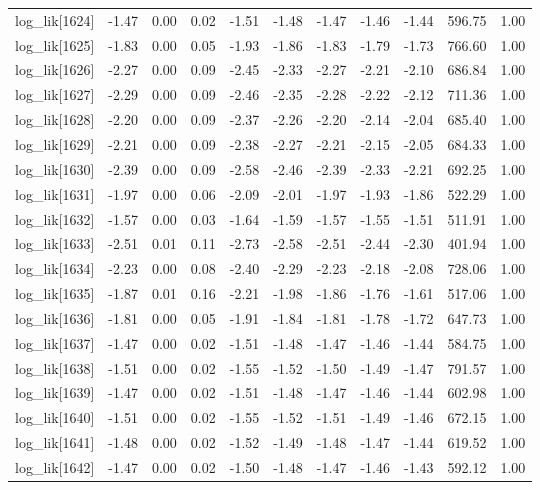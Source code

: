 \begin{table}[ht]
\begin{tabular}{rrrrrrrrrrr}
  log\_lik[1624] & -1.47 & 0.00 & 0.02 & -1.51 & -1.48 & -1.47 & -1.46 & -1.44 & 596.75 & 1.00 \\ 
  log\_lik[1625] & -1.83 & 0.00 & 0.05 & -1.93 & -1.86 & -1.83 & -1.79 & -1.73 & 766.60 & 1.00 \\ 
  log\_lik[1626] & -2.27 & 0.00 & 0.09 & -2.45 & -2.33 & -2.27 & -2.21 & -2.10 & 686.84 & 1.00 \\ 
  log\_lik[1627] & -2.29 & 0.00 & 0.09 & -2.46 & -2.35 & -2.28 & -2.22 & -2.12 & 711.36 & 1.00 \\ 
  log\_lik[1628] & -2.20 & 0.00 & 0.09 & -2.37 & -2.26 & -2.20 & -2.14 & -2.04 & 685.40 & 1.00 \\ 
  log\_lik[1629] & -2.21 & 0.00 & 0.09 & -2.38 & -2.27 & -2.21 & -2.15 & -2.05 & 684.33 & 1.00 \\ 
  log\_lik[1630] & -2.39 & 0.00 & 0.09 & -2.58 & -2.46 & -2.39 & -2.33 & -2.21 & 692.25 & 1.00 \\ 
  log\_lik[1631] & -1.97 & 0.00 & 0.06 & -2.09 & -2.01 & -1.97 & -1.93 & -1.86 & 522.29 & 1.00 \\ 
  log\_lik[1632] & -1.57 & 0.00 & 0.03 & -1.64 & -1.59 & -1.57 & -1.55 & -1.51 & 511.91 & 1.00 \\ 
  log\_lik[1633] & -2.51 & 0.01 & 0.11 & -2.73 & -2.58 & -2.51 & -2.44 & -2.30 & 401.94 & 1.00 \\ 
  log\_lik[1634] & -2.23 & 0.00 & 0.08 & -2.40 & -2.29 & -2.23 & -2.18 & -2.08 & 728.06 & 1.00 \\ 
  log\_lik[1635] & -1.87 & 0.01 & 0.16 & -2.21 & -1.98 & -1.86 & -1.76 & -1.61 & 517.06 & 1.00 \\ 
  log\_lik[1636] & -1.81 & 0.00 & 0.05 & -1.91 & -1.84 & -1.81 & -1.78 & -1.72 & 647.73 & 1.00 \\ 
  log\_lik[1637] & -1.47 & 0.00 & 0.02 & -1.51 & -1.48 & -1.47 & -1.46 & -1.44 & 584.75 & 1.00 \\ 
  log\_lik[1638] & -1.51 & 0.00 & 0.02 & -1.55 & -1.52 & -1.50 & -1.49 & -1.47 & 791.57 & 1.00 \\ 
  log\_lik[1639] & -1.47 & 0.00 & 0.02 & -1.51 & -1.48 & -1.47 & -1.46 & -1.44 & 602.98 & 1.00 \\ 
  log\_lik[1640] & -1.51 & 0.00 & 0.02 & -1.55 & -1.52 & -1.51 & -1.49 & -1.46 & 672.15 & 1.00 \\ 
  log\_lik[1641] & -1.48 & 0.00 & 0.02 & -1.52 & -1.49 & -1.48 & -1.47 & -1.44 & 619.52 & 1.00 \\ 
  log\_lik[1642] & -1.47 & 0.00 & 0.02 & -1.50 & -1.48 & -1.47 & -1.46 & -1.43 & 592.12 & 1.00 \\ 

\end{tabular}
\end{table}
